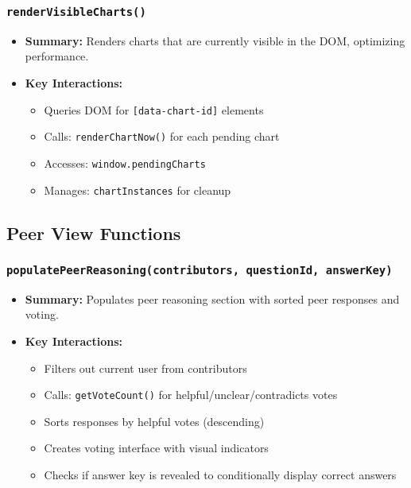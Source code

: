 \documentclass[11pt,letterpaper]{article}
\begin{document}
\subsubsection{\texttt{renderVisibleCharts()}}
\begin{itemize}
    \item \textbf{Summary:} Renders charts that are currently visible in the DOM, optimizing performance.
    \item \textbf{Key Interactions:}
    \begin{itemize}
        \item Queries DOM for \texttt{[data-chart-id]} elements
        \item Calls: \texttt{renderChartNow()} for each pending chart
        \item Accesses: \texttt{window.pendingCharts}
        \item Manages: \texttt{chartInstances} for cleanup
    \end{itemize}
\end{itemize}

\subsection{Peer View Functions}

\subsubsection{\texttt{populatePeerReasoning(contributors, questionId, answerKey)}}
\begin{itemize}
    \item \textbf{Summary:} Populates peer reasoning section with sorted peer responses and voting.
    \item \textbf{Key Interactions:}
    \begin{itemize}
        \item Filters out current user from contributors
        \item Calls: \texttt{getVoteCount()} for helpful/unclear/contradicts votes
        \item Sorts responses by helpful votes (descending)
        \item Creates voting interface with visual indicators
        \item Checks if answer key is revealed to conditionally display correct answers
    \end{itemize}
\end{itemize}
\end{document}
